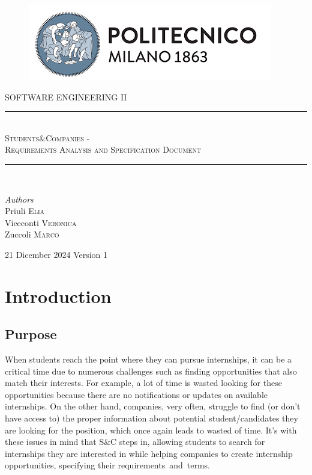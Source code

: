 \documentclass{article}
\begin{document}
\begin{figure}[t]
    \includegraphics[scale=0.8]{logo_polimi.png}
    \centering
\end{figure}

\begin{titlepage}
    \newcommand{\HRule}{\rule{\linewidth}{0.5mm}}
    \center
	\textsc{\Large SOFTWARE ENGINEERING II}\\[0.5cm]
	
	\HRule\\[0.4cm]
	    {\huge \textsc{Students\&Companies - \\Requirements Analysis and Specification Document}}\\[0.4cm]
    \HRule\\[1.5cm]
	
	\begin{minipage}{1\textwidth}
		\begin{flushleft}
			\large
			\textit{Authors}\\
			Priuli \textsc{Elia}\\
			Viceconti \textsc{Veronica}\\
			Zuccoli \textsc{Marco}\\
		\end{flushleft} 
         \hspace*{\fill} 21 Dicember 2024 \newline
         \hspace*{\fill} Version 1
	\end{minipage}
\end{titlepage}

\newpage
\tableofcontents
\newpage
\section{Introduction}
\subsection{Purpose}
When students reach the point where they can pursue internships, it can be a critical time due to numerous challenges such as finding opportunities that also match their interests.
For example, a lot of time is wasted looking for these opportunities because there are no notifications or updates on available internships.
On the other hand, companies, very often, struggle to find (or don't have access to) the proper information about potential student/candidates they are looking for the position, which once again leads to wasted of time.
It's with these issues in mind that S\&C steps in, allowing students to search for internships they are interested in while helping companies to create internship opportunities, specifying their requirements and terms.
\end{document}
